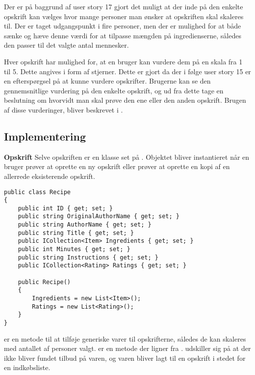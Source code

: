 Der er på baggrund af user story 17 gjort det muligt at der inde på den enkelte opskrift kan vælges hvor mange personer man ønsker at opskriften skal skaleres til.
Der er taget udgangspunkt i fire personer, men der er mulighed for at både sænke og hæve denne værdi for at tilpasse mængden på ingredienserne, således den passer til det valgte antal mennesker.


Hver opskrift har mulighed for, at en bruger kan vurdere dem på en skala fra 1 til 5.
Dette angives i form af stjerner.
Dette er gjort da der i følge user story 15 er en efterspørgsel på at kunne vurdere opskrifter.
Brugerne kan se den gennemsnitlige vurdering på den enkelte opskrift, og ud fra dette tage en beslutning om hvorvidt man skal prøve den ene eller den anden opskrift.
Brugen af disse vurderinger, bliver beskrevet i .


\subsection{Implementering}
\textbf{Opskrift}
Selve opskriften er en klasse set på .
Objektet bliver instantieret når en bruger prøver at oprette en ny opskrift eller prøver at oprette en kopi af en allerrede eksisterende opskrift.


\begin{lstlisting}[caption=Klassen \class{Recipe}]
public class Recipe
{
    public int ID { get; set; }
    public string OriginalAuthorName { get; set; }
    public string AuthorName { get; set; }
    public string Title { get; set; }
    public ICollection<Item> Ingredients { get; set; }
    public int Minutes { get; set; }
    public string Instructions { get; set; }
    public ICollection<Rating> Ratings { get; set; }

    public Recipe()
    {
        Ingredients = new List<Item>();
        Ratings = new List<Rating>();
    }
}
\end{lstlisting}

 er en metode til at tilføje generiske varer til opskrifterne, således de kan skaleres med antallet af personer valgt. 
 er en metode der ligner  fra . 
 udskiller sig på at der ikke bliver fundet tilbud på varen, og varen bliver lagt til en opskrift i stedet for en indkøbsliste.


